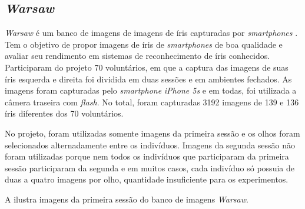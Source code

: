 \subsection{\textit{\acrshort{Warsaw}}}\label{sec:experimentos:db:warsaw}

\par \textit{\acrshort{Warsaw}} é um banco de imagens de imagens de íris capturadas por \textit{smartphones} \cite{trokielwicz2016-Warsaw}. Tem o objetivo de propor imagens de íris de \textit{smartphones} de boa qualidade e avaliar seu rendimento em sistemas de reconhecimento de íris conhecidos. Participaram do projeto 70 voluntários, em que a captura das imagens de suas íris esquerda e direita foi dividida em duas sessões e em ambientes fechados. As imagens foram capturadas pelo \textit{smartphone} \textit{iPhone 5s} e em todas, foi utilizada a câmera traseira com \textit{flash}. No total, foram capturadas 3192 imagens de 139 e 136 íris diferentes dos 70 voluntários.

\par No projeto, foram utilizadas somente imagens da primeira sessão e os olhos foram selecionados alternadamente entre os indivíduos. Imagens da segunda sessão não foram utilizadas porque nem todos os indivíduos que participaram da primeira sessão participaram da segunda e em muitos casos, cada indivíduo só possuia de duas a quatro imagens por olho, quantidade insuficiente para os experimentos.

\par A  ilustra imagens da primeira sessão do banco de imagens \textit{\acrshort{Warsaw}}.

